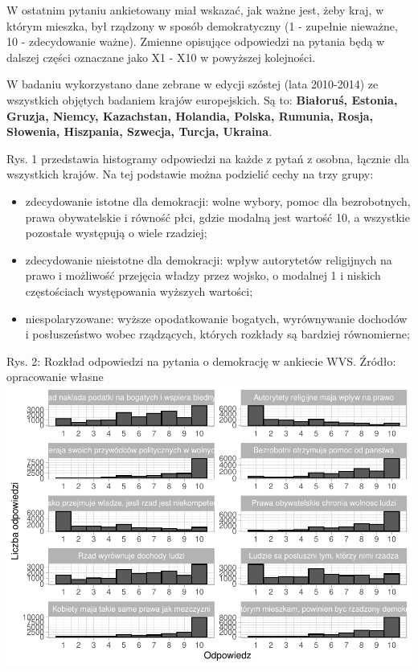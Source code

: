 \documentclass[12pt]{article}
\providecommand{\tightlist}{%
  \setlength{\itemsep}{0pt}\setlength{\parskip}{0pt}}
\begin{document}
W ostatnim pytaniu ankietowany miał wskazać, jak ważne jest, żeby kraj, w którym mieszka, był rządzony w sposób demokratyczny (1 - zupełnie nieważne, 10 - zdecydowanie ważne). Zmienne opisujące odpowiedzi na pytania będą w dalszej części oznaczane jako X1 - X10 w powyższej kolejności.

W badaniu wykorzystano dane zebrane w edycji szóstej (lata 2010-2014) ze wszystkich objętych badaniem krajów europejskich. Są to: \textbf{Białoruś, Estonia, Gruzja, Niemcy, Kazachstan, Holandia, Polska, Rumunia, Rosja, Słowenia, Hiszpania, Szwecja, Turcja, Ukraina}.

Rys. 1 przedstawia histogramy odpowiedzi na każde z pytań z osobna, łącznie dla wszystkich krajów. Na tej podstawie można podzielić cechy na trzy grupy:

\begin{itemize}
\tightlist
\item
  zdecydowanie istotne dla demokracji: wolne wybory, pomoc dla bezrobotnych, prawa obywatelskie i równość płci, gdzie modalną jest wartość 10, a wszystkie pozostałe występują o wiele rzadziej;
\item
  zdecydowanie nieistotne dla demokracji: wpływ autorytetów religijnych na prawo i możliwość przejęcia władzy przez wojsko, o modalnej 1 i niskich częstościach występowania wyższych wartości;
\item
  niespolaryzowane: wyższe opodatkowanie bogatych, wyrównywanie dochodów i posłuszeństwo wobec rządzących, których rozkłady są bardziej równomierne;
\end{itemize}

Rys. 2: Rozkład odpowiedzi na pytania o demokrację w ankiecie WVS. Źródło: opracowanie własne
\includegraphics{text_ASA_files/figure-latex/descr-plot-1.pdf}
\end{document}
